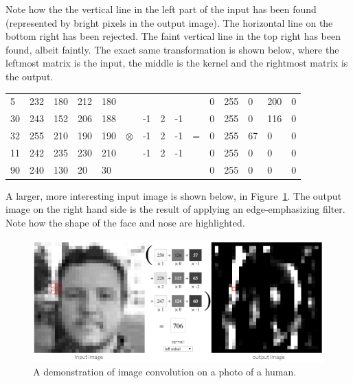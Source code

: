 Note how the the vertical line in the left part of the input has been found (represented by bright pixels in the output image). The horizontal line on the bottom right has been rejected. The faint vertical line in the top right has been found, albeit faintly. The exact same transformation is shown below, where the leftmost matrix is the input, the middle is the kernel and the rightmost matrix is the output.

\begin{table}[h!]
	\centering
	\begin{tabular}{ p{0.5cm} p{0.5cm} p{0.5cm} p{0.5cm} p{0.5cm} p{0.5cm} p{0.5cm} p{0.5cm} p{0.5cm} p{0.5cm} p{0.5cm} p{0.5cm} p{0.5cm} p{0.5cm} p{0.5cm}}
 5 & 232 & 180 & 212 & 180 &           &    &   &    &   & 0 & 255 & 0 & 200 & 0 \\
30 & 243 & 152 & 206 & 188 &           & -1 & 2 & -1 &   & 0 & 255 & 0 & 116 & 0 \\
32 & 255 & 210 & 190 & 190 & $\otimes$ & -1 & 2 & -1 & = & 0 & 255 & 67 & 0  & 0 \\
11 & 242 & 235 & 230 & 210 &           & -1 & 2 & -1 &   & 0 & 255 & 0 &  0  & 0 \\
90 & 240 & 130 &  20 &  30 &           &    &   &    &   & 0 & 255 & 0 &  0  & 0
	\end{tabular}
\end{table}

A larger, more interesting input image is shown below, in Figure~\ref{fig:image_kernel_demo}. The output image on the right hand side is the result of applying an edge-emphasizing filter. Note how the shape of the face and nose are highlighted.

\begin{figure}[h!]
  \centering
  \includegraphics[width=\textwidth]{literature_review/image_kernel_demo}
  \caption{\label{fig:image_kernel_demo} A demonstration of image convolution on a photo of a human.}
\end{figure}

